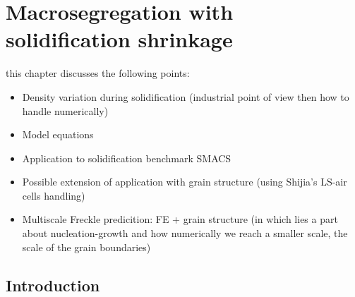 \chapter{Macrosegregation with solidification shrinkage}
\minitoc
\newpage

this chapter discusses the following points:
\begin{itemize}
\item Density variation during solidification (industrial point of view then how to handle numerically)
\item Model equations
\item Application to solidification benchmark SMACS
\item Possible extension of application with grain structure (using Shijia's LS-air cells handling)
\item Multiscale Freckle predicition: FE + grain structure (in which lies a part about nucleation-growth and how numerically 
		we reach a smaller scale, the scale of the grain boundaries)
\end{itemize}

\section{Introduction}

